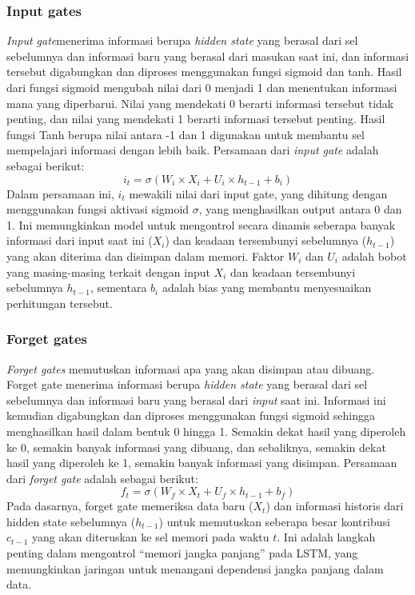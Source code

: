 \subsubsection{Input gates}
\emph{Input gate}menerima informasi berupa \emph{hidden state} yang berasal dari sel sebelumnya dan informasi baru yang berasal dari masukan saat ini, dan informasi tersebut digabungkan dan diproses menggunakan fungsi sigmoid dan tanh. Hasil dari fungsi sigmoid mengubah nilai dari 0 menjadi 1 dan menentukan informasi mana yang diperbarui. Nilai yang mendekati 0 berarti informasi tersebut tidak penting, dan nilai yang mendekati 1 berarti informasi tersebut penting. Hasil fungsi Tanh berupa nilai antara -1 dan 1 digunakan untuk membantu sel mempelajari informasi dengan lebih baik.
 Persamaan dari \emph{input gate} adalah sebagai berikut:
\begin{equation}
  \label{eq:InputGate}
  i_t = \sigma(W_i \times X_i + U_i \times h_{t-1} + b_i)
\end{equation}
Dalam persamaan ini, \( i_t \) mewakili nilai dari input gate, yang dihitung dengan menggunakan fungsi aktivasi sigmoid \( \sigma \), yang menghasilkan output antara 0 dan 1. Ini memungkinkan model untuk mengontrol secara dinamis seberapa banyak informasi dari input saat ini (\( X_i \)) dan keadaan tersembunyi sebelumnya (\( h_{t-1} \)) yang akan diterima dan disimpan dalam memori. Faktor \( W_i \) dan \( U_i \) adalah bobot yang masing-masing terkait dengan input \( X_i \) dan keadaan tersembunyi sebelumnya \( h_{t-1} \), sementara \( b_i \) adalah bias yang membantu menyesuaikan perhitungan tersebut.
\subsubsection{Forget gates}
\emph{Forget gates} memutuskan informasi apa yang akan disimpan atau dibuang. Forget gate menerima informasi berupa \emph{hidden state} yang berasal dari sel sebelumnya dan informasi baru yang berasal dari \emph{input} saat ini. Informasi ini kemudian digabungkan dan diproses menggunakan fungsi sigmoid sehingga menghasilkan hasil dalam bentuk 0 hingga  1. Semakin dekat hasil yang diperoleh ke 0, semakin banyak informasi yang dibuang, dan sebaliknya, semakin dekat hasil yang diperoleh ke 1, semakin banyak informasi yang disimpan. Persamaan dari \emph{forget gate} adalah sebagai berikut:
\begin{equation}
  \label{eq:ForgetGate}
  f_t = \sigma(W_f \times X_t + U_f \times h_{t-1} + b_f)
\end{equation}
Pada dasarnya, forget gate memeriksa data baru (\( X_t \)) dan informasi historis dari hidden state sebelumnya (\( h_{t-1} \)) untuk memutuskan seberapa besar kontribusi \( c_{t-1} \) yang akan diteruskan ke sel memori pada waktu \( t \). Ini adalah langkah penting dalam mengontrol ``memori jangka panjang'' pada LSTM, yang memungkinkan jaringan untuk menangani dependensi jangka panjang dalam data.

